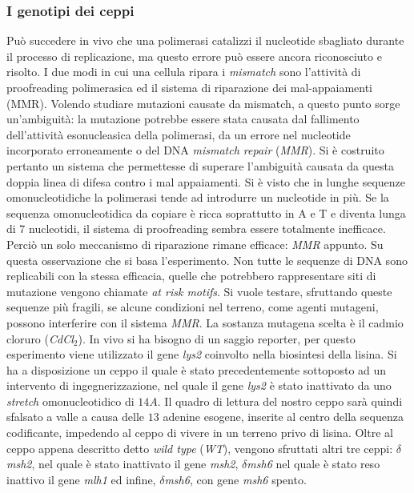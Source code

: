 	\subsubsection*{I genotipi dei ceppi}
	Può succedere in vivo che una polimerasi catalizzi il nucleotide sbagliato durante il processo di replicazione, ma questo errore può essere ancora riconosciuto e risolto. 
	I due modi in cui una cellula ripara i \emph{mismatch} sono l'attività di proofreading polimerasica ed il sistema di riparazione dei mal-appaiamenti (MMR). 
	Volendo studiare mutazioni causate da mismatch, a questo punto sorge un'ambiguità: la mutazione potrebbe essere stata causata dal fallimento dell'attività esonucleasica della polimerasi, da un errore nel nucleotide incorporato erroneamente o del DNA \emph{mismatch repair} (\emph{MMR}). 
	Si è costruito pertanto un sistema che permettesse di superare l'ambiguità causata da questa doppia linea di difesa contro i mal appaiamenti. 
	Si è visto che in lunghe sequenze omonucleotidiche la polimerasi tende ad introdurre un nucleotide in più. 
	Se la sequenza omonucleotidica da copiare è ricca soprattutto in A e T e diventa lunga di $7$ nucleotidi, il sistema di proofreading sembra essere totalmente inefficace. 
	Perci\`o un solo meccanismo di riparazione rimane efficace: \emph{MMR} appunto.
	Su questa osservazione che si basa l'esperimento. 
	Non tutte le sequenze di DNA sono replicabili con la stessa efficacia, quelle che potrebbero rappresentare siti di mutazione vengono chiamate \emph{at risk motifs}. 
	Si vuole testare, sfruttando queste sequenze più fragili, se alcune condizioni nel terreno, come agenti mutageni, possono interferire con il sistema \emph{MMR}. 
	La sostanza mutagena scelta è il cadmio cloruro (\emph{CdCl$_{2}$}). 
	In vivo si ha bisogno di un saggio reporter, per questo esperimento viene utilizzato il gene \emph{lys2} coinvolto nella biosintesi della lisina. 
	Si ha a disposizione un ceppo il quale è stato precedentemente sottoposto ad un intervento di ingegnerizzazione, nel quale il gene \emph{lys2} è stato inattivato da uno \emph{stretch} omonucleotidico di $14 A$. 
	Il quadro di lettura del nostro ceppo sarà quindi sfalsato a valle a causa delle $13$ adenine esogene, inserite al centro della sequenza codificante, impedendo al ceppo di vivere in un terreno privo di lisina. 
	Oltre al ceppo appena descritto detto \emph{wild type} (\emph{WT}), vengono sfruttati altri tre ceppi: \emph{$\delta$msh2}, nel quale è stato inattivato il gene \emph{msh2}, \emph{$\delta$msh6} nel quale è stato reso inattivo il gene \emph{mlh1} ed infine, \emph{$\delta$msh6}, con gene \emph{msh6} spento. 

